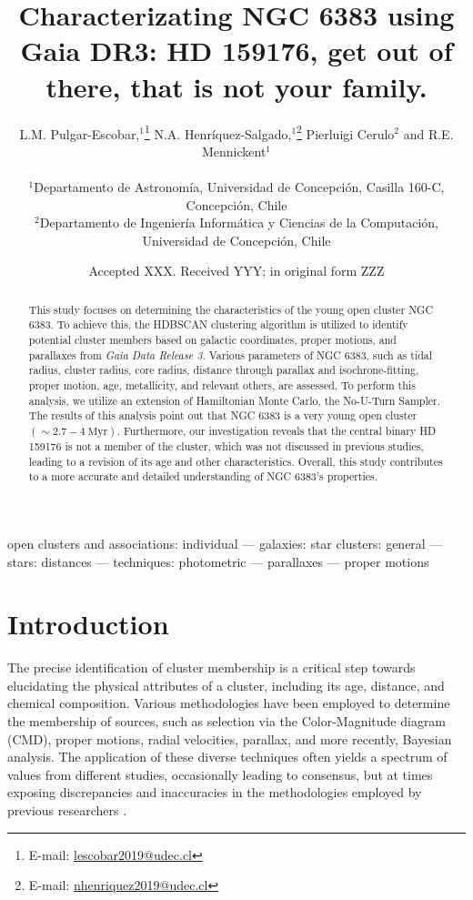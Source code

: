 \documentclass[fleqn,usenatbib,usedcolumn,useAMS]{mnras}
\title[HD 159176 and NGC 6383, a proyection]{Characterizating NGC 6383 using Gaia DR3: HD 159176, get out of there, that is not your family.}
\author[Pulgar-Escobar et al.]{L.M. Pulgar-Escobar\orcidlink{0009-0008-4359-2444},$^{1}$\thanks{E-mail: \href{mailito:lescobar2019@udec.cl}{lescobar2019@udec.cl}} 
N.A. Henríquez-Salgado,$^{1}$\thanks{E-mail: \href{mailito:nhenriquez2019@udec.cl}{nhenriquez2019@udec.cl}} Pierluigi Cerulo$^{2}$ and R.E. Mennickent$^{1}$
\\
\\
$^{1}$Departamento de Astronomía, Universidad de Concepción, Casilla 160-C, Concepción, Chile \\
$^{2}$Departamento de Ingeniería Informática y Ciencias de la Computación, Universidad de Concepción, Chile
}
\date{Accepted XXX. Received YYY; in original form ZZZ}
\begin{document}
\label{firstpage}
\pagerange{\pageref{firstpage}--\pageref{lastpage}}
\maketitle

\begin{abstract}
This study focuses on determining the characteristics of the young open cluster NGC 6383. To achieve this, the HDBSCAN clustering algorithm is utilized to identify potential cluster members based on galactic coordinates, proper motions, and parallaxes from {\sl Gaia Data Release 3}. Various parameters of NGC 6383, such as tidal radius, cluster radius, core radius, distance through parallax and isochrone-fitting, proper motion, age, metallicity, and relevant others, are assessed. To perform this analysis, we utilize an extension of Hamiltonian Monte Carlo, the No-U-Turn Sampler. The results of this analysis point out that NGC 6383 is a very young open cluster $(\sim 2.7 - 4~\mathrm{Myr})$. Furthermore, our investigation reveals that the central binary HD 159176 is not a member of the cluster, which was not discussed in previous studies, leading to a revision of its age and other characteristics. Overall, this study contributes to a more accurate and detailed understanding of NGC 6383's properties.
\end{abstract}

\begin{keywords}
open clusters and associations: individual — galaxies: star clusters: general — stars: distances — techniques: photometric — parallaxes — proper motions
\end{keywords}



\section{Introduction}

The precise identification of cluster membership is a critical step towards elucidating the physical attributes of a cluster, including its age, distance, and chemical composition. Various methodologies have been employed to determine the membership of sources, such as selection via the Color-Magnitude diagram (CMD), proper motions, radial velocities, parallax, and more recently, Bayesian analysis. The application of these diverse techniques often yields a spectrum of values from different studies, occasionally leading to consensus, but at times exposing discrepancies and inaccuracies in the methodologies employed by previous researchers \citep{1930LicOB..14..154T, 1937LicOB..18...89Z, 1949ApJ...110..117S, 2018A&A...610A..30A, 1978MNRAS.182..607F, 1989MNRAS.236..263P, 1991MNRAS.249...76B, 2005A&A...438.1163K, 2007A&A...462..157P, 1968ArA.....5....1L}.
\end{document}

